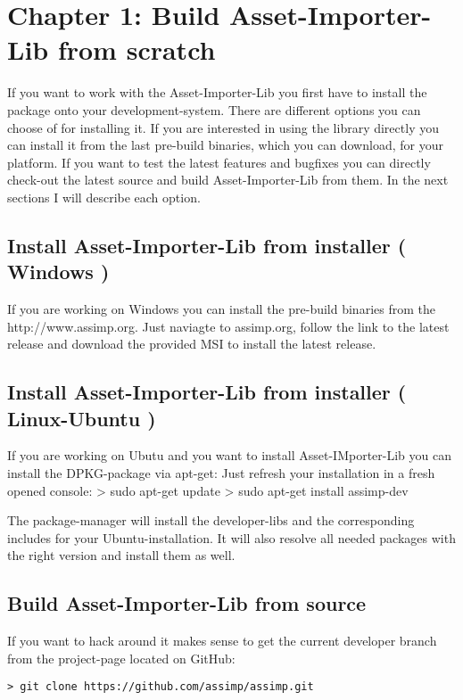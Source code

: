 
\section{Chapter 1: Build Asset-Importer-Lib from scratch}
If you want to work with the Asset-Importer-Lib you first have to install the package onto your development-system. There are different options you can choose of for installing it.
If you are interested in using the library directly you can install it from the last pre-build binaries, which you can download, for your platform. If you want to test the
latest features and bugfixes you can directly check-out the latest source and build Asset-Importer-Lib from them. 
In the next sections I will describe each option.

\subsection{Install Asset-Importer-Lib from installer ( Windows ) }
If you are working on Windows you can install the pre-build binaries from the http://www.assimp.org. Just naviagte to assimp.org, follow the link to the latest release and download the 
provided MSI to install the latest release.

\subsection{Install Asset-Importer-Lib from installer ( Linux-Ubuntu ) }
If you are working on Ubutu and you want to install Asset-IMporter-Lib you can install the DPKG-package via apt-get:
Just refresh your installation in a fresh opened console:
> sudo apt-get update
> sudo apt-get install assimp-dev
\par
The package-manager will install the developer-libs and the corresponding includes for your Ubuntu-installation. It will also resolve all needed packages with 
the right version and install them as well.
\subsection{Build Asset-Importer-Lib from source}
If you want to hack around it makes sense to get the current developer branch from the project-page located on GitHub:
\begin{lstlisting}[label=some-code,caption=Checkout the source from the assimp github project repo]
> git clone https://github.com/assimp/assimp.git
\end{lstlisting}

